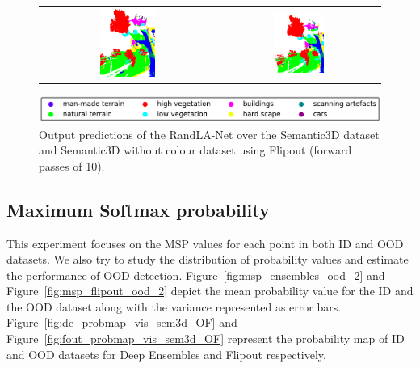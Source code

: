\begin{figure}[h!]
\begin{tabular}{cc}
            \includegraphics[width=0.33\textwidth, height=0.18\textheight]{images/ood_imgs/fout_sem3d/fout_3.pdf}&
            \includegraphics[width=0.33\textwidth, height=0.18\textheight]{images/sem3d_of/fout_sem3d_of_3.pdf}\\
        \end{tabular}
        \includegraphics[scale=0.45]{images/legend.png}
        \caption{Output predictions of the RandLA-Net over the Semantic3D dataset and Semantic3D without colour
        dataset using Flipout (forward passes of 10).}
        \label{fig:flipout_vis_sem3d_OF}
    \end{figure}   
    \FloatBarrier


    \subsection{Maximum Softmax probability}
    This experiment focuses on the MSP values for each point in both ID and OOD datasets.
    We also try to study the distribution of probability values and estimate the performance of OOD detection.
    Figure~\ref{fig:msp_ensembles_ood_2} and Figure~\ref{fig:msp_flipout_ood_2} depict the mean probability value for the ID and the OOD dataset along with the variance represented as error bars.
    Figure~\ref{fig:de_probmap_vis_sem3d_OF} and Figure~\ref{fig:fout_probmap_vis_sem3d_OF} represent the probability map of ID and OOD datasets for Deep Ensembles and Flipout respectively.

